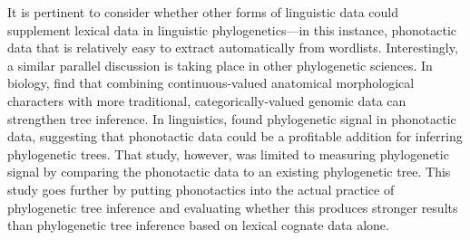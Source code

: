 \documentclass[]{article}
\begin{document}
It is pertinent to consider whether other forms of linguistic data could supplement lexical data in linguistic phylogenetics---in this instance, phonotactic data that is relatively easy to extract automatically from wordlists. Interestingly, a similar parallel discussion is taking place in other phylogenetic sciences. In biology, \textcite{parins-fukuchi_use_2018} find that combining continuous-valued anatomical morphological characters with more traditional, categorically-valued genomic data can strengthen tree inference. In linguistics, \textcite{macklin-cordes_phylogenetic_2020} found phylogenetic signal in phonotactic data, suggesting that phonotactic data could be a profitable addition for inferring phylogenetic trees. That study, however, was limited to measuring phylogenetic signal by comparing the phonotactic data to an existing phylogenetic tree. This study goes further by putting phonotactics into the actual practice of phylogenetic tree inference and evaluating whether this produces stronger results than phylogenetic tree inference based on lexical cognate data alone.
\end{document}
